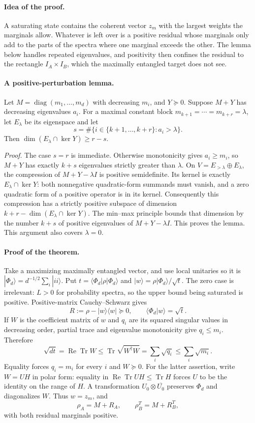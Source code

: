 \paragraph{Idea of the proof.} A saturating state contains the coherent
vector $z_m$ with the largest weights the marginals allow. Whatever is left
over is a positive residual whose marginals only add to the parts of the
spectra where one marginal exceeds the other. The lemma below handles
repeated eigenvalues, and positivity then confines the residual to the
rectangle $I_A\times I_B$, which the maximally entangled target does not
see.

\paragraph{A positive-perturbation lemma.}
Let $M=\operatorname{diag}(m_1,\ldots,m_d)$ with decreasing $m_i$, and
$Y\succeq0$. Suppose $M+Y$ has decreasing eigenvalues $a_i$.
For a maximal constant block $m_{k+1}=\cdots=m_{k+r}=\lambda$, let
$E_\lambda$ be its eigenspace and let
\[
 s=\#\{i\in\{k+1,\ldots,k+r\}:a_i>\lambda\}.
\]
Then $\dim(E_\lambda\cap\ker Y)\ge r-s$.

\emph{Proof.} The case $s=r$ is immediate. Otherwise monotonicity gives
$a_i\ge m_i$, so $M+Y$ has exactly $k+s$ eigenvalues strictly greater than
$\lambda$. On $V=E_{>\lambda}\oplus E_\lambda$, the compression of
$M+Y-\lambda I$ is positive semidefinite. Its kernel is exactly
$E_\lambda\cap\ker Y$: both nonnegative quadratic-form summands must
vanish, and a zero quadratic form of a positive operator is in its kernel.
Consequently this compression has a strictly positive subspace of dimension
$k+r-\dim(E_\lambda\cap\ker Y)$. The min--max principle bounds that
dimension by the number $k+s$ of positive eigenvalues of $M+Y-\lambda I$.
This proves the lemma. This argument also covers $\lambda=0$.

\paragraph{Proof of the theorem.}
Take a maximizing maximally entangled vector, and use local unitaries so it
is $|\Phi_d\rangle=d^{-1/2}\sum_i|ii\rangle$. Put
$t=\langle\Phi_d|\rho|\Phi_d\rangle$ and
$|w\rangle=\rho|\Phi_d\rangle/\sqrt t$. The zero case is irrelevant:
$L>0$ for probability spectra, so the upper bound being saturated is positive.
Positive-matrix Cauchy--Schwarz gives
\[
 R:=\rho-|w\rangle\langle w|\succeq0,\qquad
 \langle\Phi_d|w\rangle=\sqrt t.
\]
If $W$ is the coefficient matrix of $w$ and $q_i$ are its squared singular
values in decreasing order, partial trace and eigenvalue monotonicity give
$q_i\le m_i$. Therefore
\[
 \sqrt{dt}=\operatorname{Re}\operatorname{Tr}W
 \le\operatorname{Tr}\sqrt{W^\dagger W}
 =\sum_i\sqrt{q_i}\le\sum_i\sqrt{m_i}.
\]
Equality forces $q_i=m_i$ for every $i$ and $W\succeq0$.
For the latter assertion, write $W=UH$ in polar form: equality in
$\operatorname{Re}\operatorname{Tr}UH\le\operatorname{Tr}H$ forces
$U$ to be the identity on the range of $H$. A transformation
$U_0\otimes\overline{U_0}$ preserves $\Phi_d$ and diagonalizes $W$.
Thus $w=z_m$, and
\[
 \rho_A=M+R_A,\qquad \rho_B^T=M+R_B^T,
\]
with both residual marginals positive.

